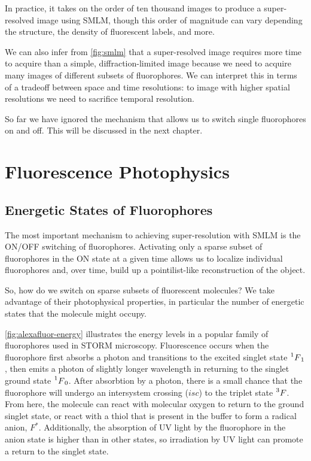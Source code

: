 \documentclass[10pt,a4paper,oneside]{book}
\begin{document}
In practice, it takes on the order of ten thousand images to produce a super-resolved image using SMLM, though this order of magnitude can vary depending the structure, the density of fluorescent labels, and more.

We can also infer from \autoref{fig:smlm} that a super-resolved image requires more time to acquire than a simple, diffraction-limited image because we need to acquire many images of different subsets of fluorophores. We can interpret this in terms of a tradeoff between space and time resolutions: to image with higher spatial resolutions we need to sacrifice temporal resolution.

So far we have ignored the mechanism that allows us to switch single fluorophores on and off. This will be discussed in the next chapter.

\chapter{Fluorescence Photophysics}

\section{Energetic States of Fluorophores}

The most important mechanism to achieving super-resolution with SMLM is the ON/OFF switching of fluorophores. Activating only a sparse subset of fluorophores in the ON state at a given time allows us to localize individual fluorophores and, over time, build up a pointilist-like reconstruction of the object.

So, how do we switch on sparse subsets of fluorescent molecules? We take advantage of their photophysical properties, in particular the number of energetic states that the molecule might occupy.

\autoref{fig:alexafluor-energy} illustrates the energy levels in a popular family of fluorophores used in STORM microscopy. Fluorescence occurs when the fluorophore first absorbs a photon and transitions to the excited singlet state $\prescript{1}{}F_1$, then emits a photon of slightly longer wavelength in returning to the singlet ground state $\prescript{1}{}F_0$. After absorbtion by a photon, there is a small chance that the fluorophore will undergo an intersystem crossing ($isc$) to the triplet state $\prescript{3}{}F$. From here, the molecule can react with molecular oxygen to return to the ground singlet state, or react with a thiol that is present in the buffer to form a radical anion, $F^*$. Additionally, the absorption of UV light by the fluorophore in the anion state is higher than in other states, so irradiation by UV light can promote a return to the singlet state.
\end{document}

